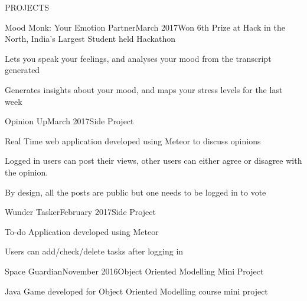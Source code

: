 \documentclass{resume} %
\begin{document}
\begin{rSection}{PROJECTS}

\begin{rSubsection}{Mood Monk: Your Emotion Partner}{March 2017}{Won 6th Prize at Hack in the North, India's Largest Student held Hackathon}{}

\item Lets you speak your feelings, and analyses your mood from the transcript generated
\item Generates insights about your mood, and maps your stress levels for the last week
 
\end{rSubsection}  


\begin{rSubsection}{Opinion Up}{March 2017}{Side Project}{} 
\item Real Time web application developed using Meteor to discuss opinions
\item Logged in users can post their views, other users can either agree or disagree with the opinion.
\item By design, all the posts are public but one needs to be logged in to vote

\end{rSubsection}



\begin{rSubsection}{Wunder Tasker}{February 2017}{Side Project}{}

\item To-do Application developed using Meteor
\item Users can add/check/delete tasks after logging in
\end{rSubsection}


\begin{rSubsection}{Space Guardian}{November 2016}{Object Oriented Modelling Mini Project}{}    

\item Java Game developed for Object Oriented Modelling course mini project

\end{rSubsection} 

\end{rSection} 


\end{document}
